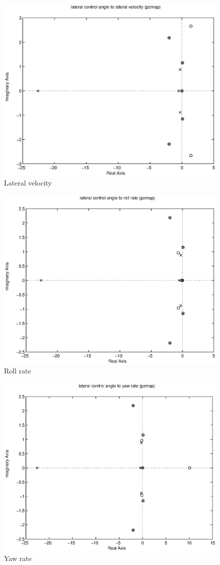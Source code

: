 \documentclass{sydeStyle}
\begin{document}
\begin{figure}[h]
    \centering
    \includegraphics[width=0.8\columnwidth]{figs/25pz}
    \caption{Lateral velocity}
    \label{fig:lat1}
\end{figure}

\begin{figure}[h]
    \centering
    \includegraphics[width=0.8\columnwidth]{figs/26pz}
    \caption{Roll rate}
    \label{fig:lat2}
\end{figure}

\begin{figure}[h]
    \centering
    \includegraphics[width=0.8\columnwidth]{figs/27pz}
    \caption{Yaw rate}
    \label{fig:lat3}
\end{figure}
\end{document}
